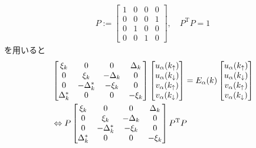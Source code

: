 \documentclass[dvipdfmx, 11pt, a4paper]{jsarticle}
\numberwithin{equation}{section}
\theoremstyle{definition}
\begin{document}
    \begin{derivationBox}
        \begin{align}
            P := 
            \left[ 
            \begin{matrix}
                1&0&0&0\\
                0&0&0&1\\
                0&1&0&0\\
                0&0&1&0
            \end{matrix}
            \right],\quad P^{\mathrm{T}}P = 1
        \end{align}
        を用いると
        \begin{align}
            &\left[
            \begin{matrix}
                \xi_k&0&0&\Delta_k\\
                0&\xi_k&-\Delta_k&0\\
                0&-\Delta_k^*&-\xi_k&0\\
                \Delta_k^*&0&0&-\xi_k
            \end{matrix}
            \right]
            \left[ 
            \begin{matrix}
                u_\alpha (k_\uparrow)\\
                u_\alpha (k_\downarrow)\\
                v_\alpha (k_\uparrow)\\
                v_\alpha (k_\downarrow)
            \end{matrix}
            \right] = E_\alpha(k)
            \left[ 
            \begin{matrix}
                u_\alpha (k_\uparrow)\\
                u_\alpha (k_\downarrow)\\
                v_\alpha (k_\uparrow)\\
                v_\alpha (k_\downarrow)
            \end{matrix}
            \right] \notag \\
            &\Leftrightarrow P \left[
            \begin{matrix}
                \xi_k&0&0&\Delta_k\\
                0&\xi_k&-\Delta_k&0\\
                0&-\Delta_k^*&-\xi_k&0\\
                \Delta_k^*&0&0&-\xi_k
            \end{matrix}
            \right]P^\mathrm{T}P

\end{align}
\end{derivationBox}
\end{document}
